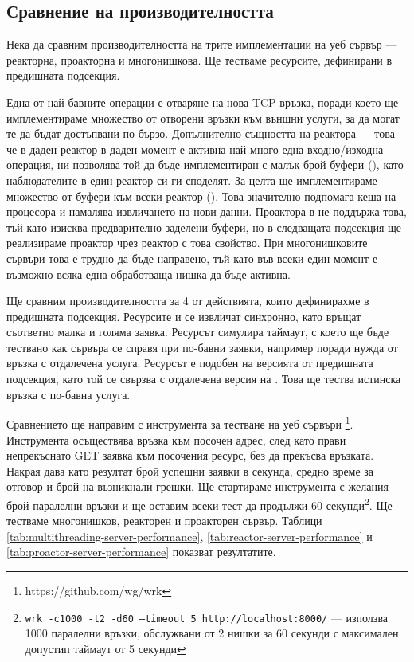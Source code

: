 \subsection{Сравнение на производителността}
\label{sec:reactor-proactor-performance}

Нека да сравним производителността на трите имплементации на уеб сървър — реакторна, проакторна и многонишкова. Ще тестваме ресурсите, дефинирани в предишната подсекция.

Една от най-бавните операции е отваряне на нова TCP връзка, поради което ще имплементираме множество от отворени връзки към външни услуги, за да могат те да бъдат достъпвани по-бързо. Допълнително същността на реактора — това че в даден реактор в даден момент е активна най-много една входно/изходна операция, ни позволява той да бъде имплементиран с малък брой буфери (), като наблюдателите в един реактор си ги споделят. За целта ще имплементираме множество от буфери към всеки реактор (). Това значително подпомага кеша на процесора и намалява извличането на нови данни. Проактора в  не поддържа това, тъй като изисква предварително заделени буфери, но в следващата подсекция ще реализираме проактор чрез реактор с това свойство. При многонишковите сървъри това е трудно да бъде направено, тъй като във всеки един момент е възможно всяка една обработваща нишка да бъде активна.

Ще сравним производителността за 4 от действията, които дефинирахме в предишната подсекция. Ресурсите \code{/} и  се извличат синхронно, като връщат съответно малка и голяма заявка. Ресурсът  симулира таймаут, с което ще бъде тествано как сървъра се справя при по-бавни заявки, например поради нужда от връзка с отдалечена услуга. Ресурсът  е подобен на версията от предишната подсекция, като той се свързва с отдалечена версия на . Това ще тества истинска връзка с по-бавна услуга.

Сравнението ще направим с инструмента за тестване на уеб сървъри \footnote{https://github.com/wg/wrk}. Инструмента осъществява връзка към посочен адрес, след като прави непрекъснато GET заявка към посочения ресурс, без да прекъсва връзката. Накрая дава като резултат брой успешни заявки в секунда, средно време за отговор и брой на възникнали грешки. Ще стартираме инструмента с желания брой паралелни връзки и ще оставим всеки тест да продължи 60 секунди\footnote{\texttt{wrk -c1000 -t2 -d60 --timeout 5 http://localhost:8000/} — използва 1000 паралелни връзки, обслужвани от 2 нишки за 60 секунди с максимален допустип таймаут от 5 секунди}. Ще тестваме многонишков, реакторен и проакторен сървър. Таблици \ref{tab:multithreading-server-performance}, \ref{tab:reactor-server-performance} и \ref{tab:proactor-server-performance} показват резултатите.

